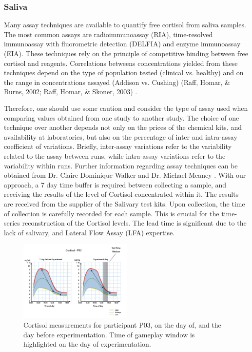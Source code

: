 \documentclass[10pt, titlepage, twocolumn]{article}
\newcommand{\ii}{\indent\indent}
\begin{document}
\subsubsection{Saliva}
\ii
Many assay techniques are available to quantify free cortisol from saliva samples. The most common assays are radioimmunoassay (RIA), time-resolved immunoassay with fluorometric detection (DELFIA) and enzyme immunoassay (EIA). These techniques rely on the principle of competitive binding between free cortisol and reagents. Correlations betweens concentrations yielded from these techniques depend on the type of population tested (clinical vs. healthy) and on the range in concentrations assayed (Addison vs. Cushing) (Raff, Homar, \& Burns, 2002; Raff, Homar, \& Skoner, 2003) \cite{stress}. 

Therefore, one should use some caution and consider the type of assay used when comparing values obtained from one study to another study. The choice of one technique over another depends not only on the prices of the chemical kits, and availability at laboratories, but also on the percentage of inter and intra-assay coefficient of variations. Briefly, inter-assay variations refer to the variability related to the assay between runs, while intra-assay variations refer to the variability within runs. Further information regarding assay techniques can be obtained from Dr. Claire-Dominique Walker and Dr. Michael Meaney \cite{stress}. With our approach, a 7 day time buffer is required between collecting a sample, and receiving the results of the level of Cortisol concentrated within it. The results are received from the supplier of the Salivary test kits. Upon collection, the time of collection is carefully recorded for each sample. This is crucial for the time-series reconstruction of the Cortisol levels. The lead time is significant due to the lack of salivary, and Lateral Flow Assay (LFA) expertise.

\begin{figure}[ht]
\centering
	\includegraphics[width=0.5\textwidth]{cortisol}
	\caption{Cortisol measurements for participant P03, on the day of, and the day before experimentation. Time of gameplay window is highlighted on the day of experimentation. }
	\label{cortisol}
\end{figure}
\end{document}
